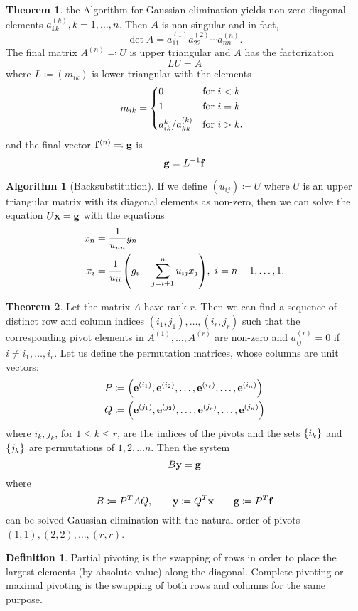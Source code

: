 \documentclass[11pt,letterpaper]{article}
\numberwithin{figure}{section} %
\newcommand{\inv}[1]{#1^{-1}}
\newcommand{\keyword}[1]{\colorbox{cyan!20!}{#1}}
\theoremstyle{definition}
\newtheorem{theorem}{Theorem}[subsection]
\theoremstyle{definition}
\theoremstyle{definition}
\newtheorem{definition}{Definition}[subsection]
\theoremstyle{definition}
\theoremstyle{remark}
\theoremstyle{remark}
\theoremstyle{definition}
\newtheorem*{algorithm}{Algorithm}
\theoremstyle{remark}
\theoremstyle{remark}
\begin{document}
\begin{multicols*}{3}
\begin{theorem}
	the Algorithm for Gaussian elimination yields non-zero diagonal elements
	$a_{kk}^{(k)}, k = 1, \dots, n$. Then $A$ is non-singular and in fact,
	\[
		\det A = a_{11}^{(1)}a_{22}^{(2)} \cdots a_{nn}^{(n)}.
	\]
	The final matrix $A^{(n)} \eqqcolon U$ is upper triangular and $A$ has the
	factorization
	\[
		LU = A
	\]
	where $L \coloneqq (m_{ik})$ is lower triangular with the elements
	\[
		m_{ik} =
		\begin{cases*}
			0 & for $i < k$ \\
			1 & for $i = k$ \\
			a_{ik}^{k} / a_{kk}^{(k)} & for $i > k$.
		\end{cases*}
	\]
	and the final vector $\vb{f}^{(n)} \eqqcolon \vb{g}$ is 
	\[
		\vb{g} = \inv{L} \vb{f}
	\]
\end{theorem}
\begin{algorithm}[Backsubstitution]
	If we define $(u_{ij}) \coloneqq U$ where $U$ is an upper triangular matrix
	with its diagonal elements as non-zero, then we can solve the equation
	$U\vb{x} = \vb{g}$ with the equations
	\begin{align*}
		x_n &= \frac{1}{u_{nn}}g_n \\
		x_i &= \frac{1}{u_{ii}}\pqty{g_i - \sum_{j = i + 1}^n u_{ij}x_j},~i = n-1, \ldots, 1.
	\end{align*}
\end{algorithm}
\begin{theorem}
	Let the matrix $A$ have rank $r$. Then we can find a sequence of distinct row
	and column indices $(i_1, j_1), \ldots, (i_r, j_r)$ such that the
	corresponding pivot elements in $A^{(1)}, \ldots, A^{(r)}$ are non-zero and
	$a_{ij}^{(r)} = 0$ if $i \neq i_1, \ldots, i_r$. Let us define the
	permutation matrices, whose columns are unit vectors:
	\begin{align*}
		P &\coloneqq \pqty{\vb{e}^{(i_1)}, \vb{e}^{(i_2)}, \ldots, \vb{e}^{(i_r)}, \ldots, \vb{e}^{(i_n)}} \\
		Q &\coloneqq \pqty{\vb{e}^{(j_1)}, \vb{e}^{(j_2)}, \ldots, \vb{e}^{(j_r)}, \ldots, \vb{e}^{(j_n)}}
	\end{align*}
	where $i_k, j_k$, for $1 \leq k \leq r$, are the indices of the pivots
	and the sets $\Bqty{i_k}$ and $\Bqty{j_k}$ are permutations of $1,2,\ldots n$.
	Then the system
	\[
		B\vb{y} = \vb{g}
	\]
	where
	\[
		B \coloneqq P^T A Q, \qquad \vb{y} \coloneqq Q^T \vb{x} \qquad \vb{g} \coloneqq P^T \vb{f}
	\]
	can be solved Gaussian elimination with the natural order of pivots $(1,1),
	(2,2), \ldots, (r,r)$.
\end{theorem}
\begin{definition}
	\keyword{Partial pivoting} is the swapping of rows in order to place the
	largest elements (by absolute value) along the diagonal. \keyword{Complete
	pivoting} or maximal pivoting is the swapping of both rows and columns for
	the same purpose.
\end{definition}

\end{multicols*}
\end{document}
